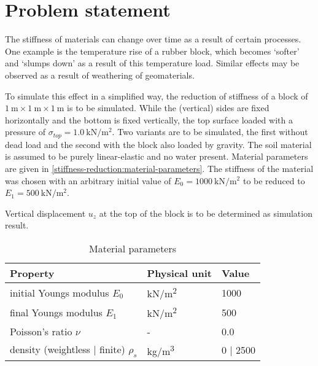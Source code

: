 \section{Problem statement}
\label{stiffness-reduction:sec:problem-statement}

The stiffness of materials can change over time as a result of certain
processes. One example is the temperature rise of a rubber block, which becomes
‘softer’ and ‘slumps down’ as a result of this temperature load. Similar
effects may be observed as a result of weathering of geomaterials.

To simulate this effect in a simplified way, the reduction of stiffness of a
block of $\SI{1}{\metre} \times \SI{1}{\metre} \times \SI{1}{\metre}$ is to be
simulated. While the (vertical) sides are fixed horizontally and the bottom is
fixed vertically, the top surface loaded with a pressure of $\sigma_{top} =
    \SI[per-mode = symbol]{1.0}{\kilo\newton\per\square\metre}$. Two variants are
to be simulated, the first without dead load and the second with the block also
loaded by gravity. The soil material is assumed to be purely linear-elastic and
no water present. Material parameters are given in
\autoref{stiffness-reduction:material-parameters}. The stiffness of the
material was chosen with an arbitrary initial value of $E_0 = \SI[per-mode =
        symbol]{1000}{\kilo\newton\per\square\metre}$ to be reduced to $E_1 =
    \SI[per-mode = symbol]{500}{\kilo\newton\per\square\metre}$.

Vertical displacement $u_z$ at the top of the block is to be determined as
simulation result.

\begin{table}[htbp]
    \centering
    \caption{Material parameters}
    \label{stiffness-reduction:material-parameters}
    \begin{tabularx}{\textwidth}{XYY}

        \hline

        Property                                     & Physical unit                & Value      \\

        \hline

        initial Youngs modulus $E_0$                 & \si[per-mode =
        symbol]{\kilo\newton\per\square\metre}       & \SI{1000}{}                               \\

        final Youngs modulus $E_1$                   & \si[per-mode =
        symbol]{\kilo\newton\per\square\metre}       & \SI{500}{}                                \\

        Poisson's ratio $\nu$                        & -                            & \SI{0.0}{} \\

        density (weightless $\vert$ finite) $\rho_s$ & \si[per-mode =
        symbol]{\kilogram\per\cubic\metre}           & \SI{0}{} $\vert$ \SI{2500}{}              \\

        \hline
    \end{tabularx}
\end{table}

